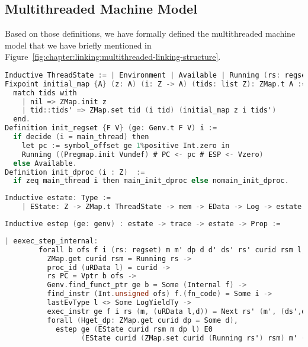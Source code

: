 \subsection{Multithreaded Machine Model}
\label{chapter:linking:subsec:multithreaded-machine-model}

Based on those definitions, we have formally defined 
the multithreaded machine model that we have briefly 
mentioned in Figure~\ref{fig:chapter:linking:multithreaded-linking-structure}.
\begin{lstlisting}[language=C]
Inductive ThreadState := | Environment | Available | Running (rs: regset).
Fixpoint initial_map {A} (z: A) (i: Z -> A) (tids: list Z): ZMap.t A :=
  match tids with
    | nil => ZMap.init z
    | tid::tids' => ZMap.set tid (i tid) (initial_map z i tids')
  end.
Definition init_regset {F V} (ge: Genv.t F V) i :=
  if decide (i = main_thread) then
    let pc := symbol_offset ge 1%positive Int.zero in
    Running ((Pregmap.init Vundef) # PC <- pc # ESP <- Vzero)
  else Available.
Definition init_dproc (i : Z)  :=
  if zeq main_thread i then main_init_dproc else nomain_init_dproc.
\end{lstlisting}



\begin{lstlisting}[language=C]
  Inductive estate: Type :=
    | EState: Z -> ZMap.t ThreadState -> mem -> EData -> Log -> estate.
\end{lstlisting}


\begin{lstlisting}[language=C]
  Inductive estep (ge: genv) : estate -> trace -> estate -> Prop :=
\end{lstlisting}


\begin{lstlisting}[language=C]
    | eexec_step_internal:
        forall b ofs f i (rs: regset) m m' dp d d' ds' rs' curid rsm l,
          ZMap.get curid rsm = Running rs ->
          proc_id (uRData l) = curid ->
          rs PC = Vptr b ofs ->
          Genv.find_funct_ptr ge b = Some (Internal f) ->
          find_instr (Int.unsigned ofs) f.(fn_code) = Some i ->
          lastEvType l <> Some LogYieldTy ->
          exec_instr ge f i rs (m, (uRData l,d)) = Next rs' (m', (ds',d')) ->
          forall (Hget_dp: ZMap.get curid dp = Some d),
            estep ge (EState curid rsm m dp l) E0
                  (EState curid (ZMap.set curid (Running rs') rsm) m' (ZMap.set curid (Some d') dp) l)
\end{lstlisting}



